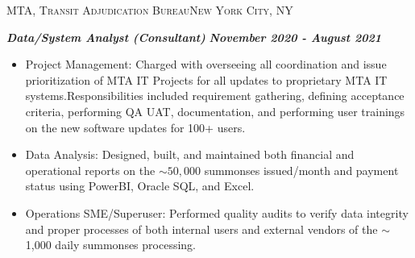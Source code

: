 \documentclass[a4paper]{article}
\newcommand{\jobtitle} [1] {
    {\hspace*{-18pt} \textsc{#1}}

}
\begin{document}
\jobtitle{MTA, Transit Adjudication Bureau\hfill New York City, NY}
\hspace*{-16pt}\textit{\textbf{Data/System Analyst (Consultant)}} \hfill \textit{\textbf{November 2020 - August 2021}}\\
\vspace{-1mm}
\begin{itemize}[leftmargin=10pt,align=left] \itemsep 1pt
         \vspace{-1.5mm} \item
            Project Management: Charged with overseeing all coordination and issue prioritization of MTA IT Projects for all updates
            to proprietary MTA IT systems.Responsibilities included requirement gathering, defining acceptance criteria, performing
            QA UAT, documentation, and performing user trainings on the new software updates for 100+ users.

        \vspace{-1.5mm} \item
            Data Analysis: Designed, built, and maintained both financial and operational reports on the $\sim50,000$ summonses
            issued/month and payment status using PowerBI, Oracle SQL, and Excel.
         \vspace{-1.5mm} \item
            Operations SME/Superuser: Performed quality audits to verify data integrity and proper processes of both internal users
            and external vendors of the $\sim$1,000 daily summonses processing.
\end{itemize}
\end{document}
